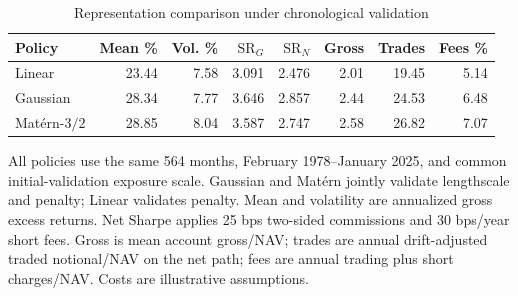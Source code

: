\begin{table}[H]\centering\small\setlength{\tabcolsep}{5pt}
\caption{Representation comparison under chronological validation}\label{tab:kernel_performance}
\begin{tabular}{@{}lrrrrrrr@{}}\toprule
Policy & Mean \% & Vol. \% & $\mathrm{SR}_G$ & $\mathrm{SR}_N$ & Gross & Trades & Fees \% \\ \midrule
Linear & 23.44 & 7.58 & 3.091 & 2.476 & 2.01 & 19.45 & 5.14 \\
Gaussian & 28.34 & 7.77 & 3.646 & 2.857 & 2.44 & 24.53 & 6.48 \\
Mat\'ern-$3/2$ & 28.85 & 8.04 & 3.587 & 2.747 & 2.58 & 26.82 & 7.07 \\
\bottomrule\end{tabular}\par\vspace{5pt}
\begin{minipage}{\textwidth}\footnotesize All policies use the same 564 months, February 1978--January 2025, and common initial-validation exposure scale. Gaussian and Mat\'ern jointly validate lengthscale and penalty; Linear validates penalty. Mean and volatility are annualized gross excess returns. Net Sharpe applies 25 bps two-sided commissions and 30 bps/year short fees. Gross is mean account gross/NAV; trades are annual drift-adjusted traded notional/NAV on the net path; fees are annual trading plus short charges/NAV. Costs are illustrative assumptions.\end{minipage}\end{table}
